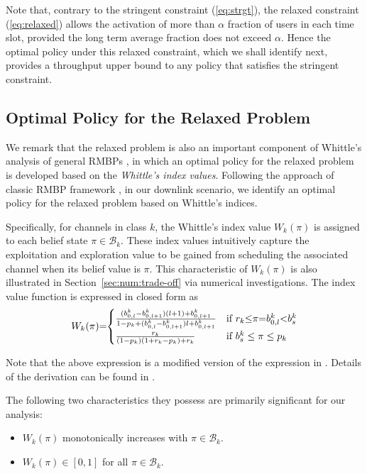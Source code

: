\documentclass[11pt,twocolumn]{IEEEtran}
\begin{document}
Note that, contrary to the stringent constraint (\ref{eq:strgt}), the relaxed constraint (\ref{eq:relaxed}) allows the activation of more than $\alpha$ fraction of users in each time slot, provided the long term average fraction does not exceed $\alpha$. Hence the optimal policy under this relaxed constraint, which we shall identify next, provides a throughput upper bound to any policy that satisfies the stringent constraint.

\subsection{Optimal Policy for the Relaxed Problem}

We remark that the relaxed problem is also an important component of Whittle's analysis of general RMBPs \cite{Whittle}, in which an optimal policy for the relaxed problem is developed based on the \emph{Whittle's index values}. Following the approach of classic RMBP framework \cite{Whittle}, in our downlink scenario, we identify an optimal policy for the relaxed problem based on Whittle's indices.

Specifically, for channels in class $k$, the Whittle's index value
$W_k(\pi)$ is assigned to each belief state $\pi \in \mathcal{B}_k$.
These index values intuitively capture the exploitation and
exploration value to be gained from scheduling the associated
channel when its belief value is $\pi$.  This characteristic of
$W_k(\pi)$ is also illustrated in Section~\ref{sec:num:trade-off} via
numerical investigations. The index value function is expressed in closed form as 
\begin{align}
\label{eq:indices}
W_k(\pi){=}\hspace{-2pt}\begin{cases}
\frac{(b^k_{0,l}{-}b^k_{0,l+1}) (l{+}1){+}b^k_{0,l+1}}{1{-}p_k{+}(b^k_{0,l}{-}b^k_{0,l+1})l{+}b^k_{0,l+1}} &\text{if $r_k{\leq}\pi{=}b^k_{0,l}{<}b^k_s$} \\
\frac{r_k}{(1-p_k)(1+r_k-p_k)+r_k} &\text{if $b^k_s \leq \pi\leq p_k$}
\end{cases}
\end{align}

Note that the above expression is a modified version of the expression in \cite{Zhao_index}. Details of the derivation can be found in \cite{Wenzhuo_infocom12}.

The following two characteristics
they possess are primarily significant for our analysis:
\begin{itemize}
\item $W_k(\pi)$ monotonically increases with $\pi \in \mathcal{B}_k$.
\item $W_k(\pi)\in [0,1]$ for all $\pi \in \mathcal{B}_k$.
\end{itemize}
\end{document}
